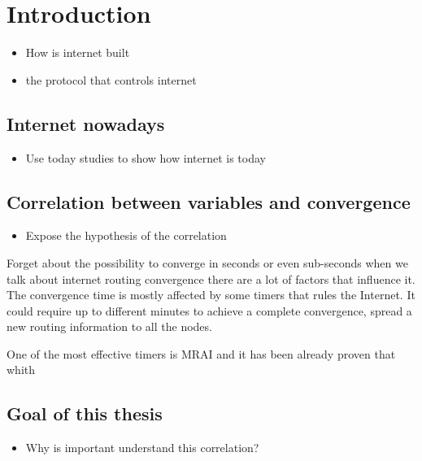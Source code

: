 \chapter{Introduction}
\label{cha:introduction}

\begin{itemize}
    \item How is internet built
    \item the protocol that controls internet
\end{itemize}

\section{Internet nowadays}
\label{sec:internet_today}

\begin{itemize}
    \item Use today studies to show how internet is today
\end{itemize}

\section{Correlation between variables and convergence}
\label{sec:bgp_correlations}

\begin{itemize}
    \item Expose the hypothesis of the correlation
\end{itemize}

Forget about the possibility to converge in seconds or even sub-seconds
when we talk about internet routing convergence there are a lot of factors
that influence it.
The convergence time is mostly affected by some timers that rules the Internet.
It could require up to different minutes to achieve a complete convergence, 
spread a new routing information to all the nodes.

One of the most effective timers is \ac{MRAI} and it has been already
proven  that whith 
\section{Goal of this thesis}
\label{sec:thesis_goal}

\begin{itemize}
    \item Why is important understand this correlation?
\end{itemize}